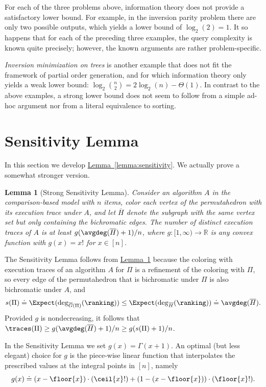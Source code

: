 \documentclass[11pt]{article}
\numberwithin{equation}{section}
\newtheorem{lemma}[theorem]{Lemma}
\theoremstyle{definition}
\theoremstyle{plain}
\newcommand{\expref}[2]{\hyperref[#2]{#1~\ref{#2}}}
\begin{document}
For each of the three problems above, information theory does not provide a satisfactory lower bound. For example, in the inversion parity problem there are only two possible outputs, which yields a lower bound of $\log_2(2)=1$. It so happens that for each of the preceding three examples, the query complexity is known quite precisely; however, the known arguments are rather problem-specific.

\emph{Inversion minimization on trees} is another example that does not fit the framework of partial order generation, and for which information theory only yields a weak lower bound: $\log_2 \binom{n}{2} = 2 \log_2(n) - \Theta(1)$. In contrast to the above examples, a strong lower bound does not seem to follow from a simple ad-hoc argument nor from a literal equivalence to sorting. 




\section{Sensitivity Lemma}
\label{sec:sensitivity}

In this section we develop \expref{Lemma}{lemma:sensitivity}.
We actually prove a somewhat stronger version.

\begin{lemma}[Strong Sensitivity Lemma]\label{lemma:sensitivity:strong}
Consider an algorithm $A$ in the comparison-based
model with $n$ items, color each vertex of the permutahedron with its execution trace under $A$, and let $\overline{H}$ denote the subgraph with the same vertex set but only containing the bichromatic edges. The number of distinct execution traces of $A$ is at least $g(\avgdeg(\overline{H})+1)/n$, where
$g: [1,\infty) \to \mathbb{R}$ is any convex function with $g(x) = x!$ for $x \in [n]$.
\end{lemma}
The Sensitivity Lemma follows from \expref{Lemma}{lemma:sensitivity:strong} because the coloring with execution traces of an algorithm $A$ for $\Pi$ is a refinement of the coloring with $\Pi$, so every edge of the permutahedron that is bichromatic under $\Pi$ is also bichromatic under $A$, and
\[
s(\Pi) \doteq \Expect(\deg_{\overline{G}(\Pi)}(\ranking)) \le \Expect(\deg_{\overline{H}}(\ranking)) \doteq \avgdeg(\overline{H}). 
\]
Provided $g$ is nondecreasing, it follows that $\traces(\Pi) \ge g(\avgdeg(\overline{H})+1)/n \ge g(s(\Pi)+1)/n$.

In the Sensitivity Lemma we set $g(x) = \Gamma(x+1)$. An optimal (but less elegant) choice for $g$ is the piece-wise linear function that interpolates the prescribed values at the integral points in $[n]$, namely
\[    g(x) \doteq
      (x - \floor{x})\cdot(\ceil{x}!)
      +
      (1 - (x - \floor{x}))\cdot(\floor{x}!).
\]      
\end{document}
